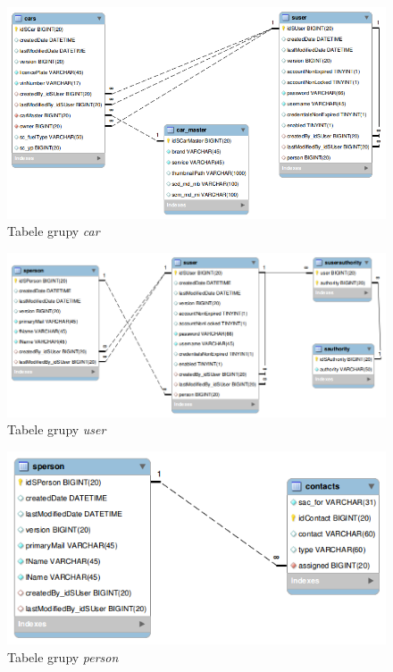 	\begin{figure}[H]
		\centering
		\includegraphics[width=1.0\textwidth]{images/db/car}
		\caption[Tabele grupy \textit{car}]{
			Tabele grupy \textit{car}
		}
		\label{app:schema_db}
	\end{figure}
	\begin{figure}[H]
		\centering
		\includegraphics[width=1.0\textwidth]{images/db/user}
		\caption[Tabele grupy \textit{user}]{
			Tabele grupy \textit{user}
		}
		\label{app:schema_db}
	\end{figure}
	\begin{figure}[H]
		\centering
		\includegraphics[width=1.0\textwidth]{images/db/person}
		\caption[Tabele grupy \textit{person}]{
			Tabele grupy \textit{person}
		}
		\label{app:schema_db}
	\end{figure}
